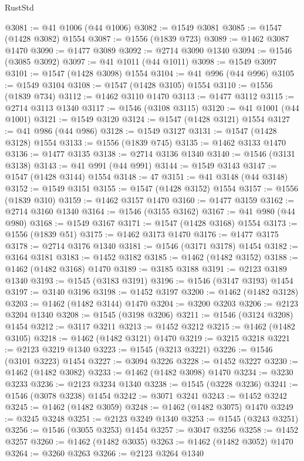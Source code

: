\begin{lexlean}{RustStd}
\begin{coremodule}
{\begin{coremodule}
{{{{{{{{{{{{{{{{{{{{{{{{{{{{{{@3081 := @41 @1006 (@44 @1006)
@3082 := @1549 @3081
@3085 := @1547 (@1428 @3082) @1554
@3087 := @1556 (@1839 @723)
@3089 := @1462 @3087 @1470
@3090 := @1477 @3089
@3092 := @2714 @3090 @1340
@3094 := @1546 (@3085 @3092)
@3097 := @41 @1011 (@44 @1011)
@3098 := @1549 @3097
@3101 := @1547 (@1428 @3098) @1554
@3104 := @41 @996 (@44 @996)
@3105 := @1549 @3104
@3108 := @1547 (@1428 @3105) @1554
@3110 := @1556 (@1839 @734)
@3112 := @1462 @3110 @1470
@3113 := @1477 @3112
@3115 := @2714 @3113 @1340
@3117 := @1546 (@3108 @3115)
@3120 := @41 @1001 (@44 @1001)
@3121 := @1549 @3120
@3124 := @1547 (@1428 @3121) @1554
@3127 := @41 @986 (@44 @986)
@3128 := @1549 @3127
@3131 := @1547 (@1428 @3128) @1554
@3133 := @1556 (@1839 @745)
@3135 := @1462 @3133 @1470
@3136 := @1477 @3135
@3138 := @2714 @3136 @1340
@3140 := @1546 (@3131 @3138)
@3143 := @41 @991 (@44 @991)
@3144 := @1549 @3143
@3147 := @1547 (@1428 @3144) @1554
@3148 := 47
@3151 := @41 @3148 (@44 @3148)
@3152 := @1549 @3151
@3155 := @1547 (@1428 @3152) @1554
@3157 := @1556 (@1839 @310)
@3159 := @1462 @3157 @1470
@3160 := @1477 @3159
@3162 := @2714 @3160 @1340
@3164 := @1546 (@3155 @3162)
@3167 := @41 @980 (@44 @980)
@3168 := @1549 @3167
@3171 := @1547 (@1428 @3168) @1554
@3173 := @1556 (@1839 @51)
@3175 := @1462 @3173 @1470
@3176 := @1477 @3175
@3178 := @2714 @3176 @1340
@3181 := @1546 (@3171 @3178) @1454
@3182 := @3164 @3181
@3183 := @1452 @3182
@3185 := @1462 (@1482 @3152)
@3188 := @1462 (@1482 @3168) @1470
@3189 := @3185 @3188
@3191 := @2123 @3189 @1340
@3193 := @1545 (@3183 @3191)
@3196 := @1546 (@3147 @3193) @1454
@3197 := @3140 @3196
@3198 := @1452 @3197
@3200 := @1462 (@1482 @3128)
@3203 := @1462 (@1482 @3144) @1470
@3204 := @3200 @3203
@3206 := @2123 @3204 @1340
@3208 := @1545 (@3198 @3206)
@3211 := @1546 (@3124 @3208) @1454
@3212 := @3117 @3211
@3213 := @1452 @3212
@3215 := @1462 (@1482 @3105)
@3218 := @1462 (@1482 @3121) @1470
@3219 := @3215 @3218
@3221 := @2123 @3219 @1340
@3223 := @1545 (@3213 @3221)
@3226 := @1546 (@3101 @3223) @1454
@3227 := @3094 @3226
@3228 := @1452 @3227
@3230 := @1462 (@1482 @3082)
@3233 := @1462 (@1482 @3098) @1470
@3234 := @3230 @3233
@3236 := @2123 @3234 @1340
@3238 := @1545 (@3228 @3236)
@3241 := @1546 (@3078 @3238) @1454
@3242 := @3071 @3241
@3243 := @1452 @3242
@3245 := @1462 (@1482 @3059)
@3248 := @1462 (@1482 @3075) @1470
@3249 := @3245 @3248
@3251 := @2123 @3249 @1340
@3253 := @1545 (@3243 @3251)
@3256 := @1546 (@3055 @3253) @1454
@3257 := @3047 @3256
@3258 := @1452 @3257
@3260 := @1462 (@1482 @3035)
@3263 := @1462 (@1482 @3052) @1470
@3264 := @3260 @3263
@3266 := @2123 @3264 @1340
}}}}}}}}}}}}}}}}}}}}}}}}}}}}}}
\end{coremodule}}
\end{coremodule}
\end{lexlean}
